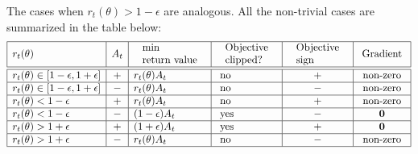 The cases when $r_t(\theta) > 1 - \epsilon$ are analogous. All the non-trivial cases are summarized in the table below:
$$\begin{array}{|l|c|l|l|c|c|}
    \hline r_t(\theta) & A_t & \begin{array}{l}
    \text { min } \\
    \text { return value }
    \end{array} & \begin{array}{l}
    \text { Objective } \\
    \text { clipped? }
    \end{array} & \begin{array}{l}
    \text { Objective } \\
    \text { sign }
    \end{array} & \text { Gradient } \\
    \hline \hline r_t(\theta) \in[1-\epsilon, 1+\epsilon] & + & r_t(\theta) A_t & \text { no } & + & \text{non-zero} \\
    \hline r_t(\theta) \in[1-\epsilon, 1+\epsilon] & - & r_t(\theta) A_t & \text { no } & - & \text{non-zero} \\
    \hline r_t(\theta)<1-\epsilon & + & r_t(\theta) A_t & \text { no } & + & \text{non-zero} \\
    \hline r_t(\theta)<1-\epsilon & - & (1-\epsilon) A_t & \text { yes } & - & \mathbf{0} \\
    \hline r_t(\theta)>1+\epsilon & + & (1+\epsilon) A_t & \text { yes } & + & \mathbf{0} \\
    \hline r_t(\theta)>1+\epsilon & - & r_t(\theta) A_t & \text { no } & - & \text{non-zero} \\
    \hline
    \end{array}$$
